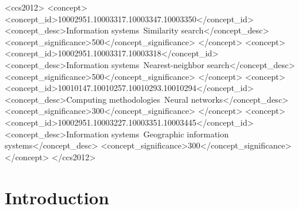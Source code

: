 \documentclass[sigconf]{acmart}
\begin{document}
\begin{CCSXML}
<ccs2012>
  <concept>
    <concept_id>10002951.10003317.10003347.10003350</concept_id>
    <concept_desc>Information systems~Similarity search</concept_desc>
    <concept_significance>500</concept_significance>
  </concept>
  <concept>
    <concept_id>10002951.10003317.10003318</concept_id>
    <concept_desc>Information systems~Nearest-neighbor search</concept_desc>
    <concept_significance>500</concept_significance>
  </concept>
  <concept>
    <concept_id>10010147.10010257.10010293.10010294</concept_id>
    <concept_desc>Computing methodologies~Neural networks</concept_desc>
    <concept_significance>300</concept_significance>
  </concept>
  <concept>
    <concept_id>10002951.10003227.10003351.10003445</concept_id>
    <concept_desc>Information systems~Geographic information systems</concept_desc>
    <concept_significance>300</concept_significance>
  </concept>
</ccs2012>
\end{CCSXML}




\maketitle

\section{Introduction}
\label{sec:intro}
\end{document}
